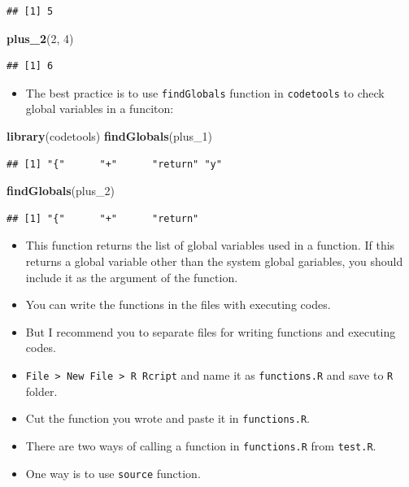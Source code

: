 \documentclass[]{book}
\newenvironment{Shaded}{\begin{snugshade}}{\end{snugshade}}
\newcommand{\KeywordTok}[1]{\textcolor[rgb]{0.13,0.29,0.53}{\textbf{#1}}}
\newcommand{\DecValTok}[1]{\textcolor[rgb]{0.00,0.00,0.81}{#1}}
\newcommand{\NormalTok}[1]{#1}
\providecommand{\tightlist}{%
  \setlength{\itemsep}{0pt}\setlength{\parskip}{0pt}}
\begin{document}
\begin{verbatim}
## [1] 5
\end{verbatim}

\begin{Shaded}
\begin{Highlighting}[]
\KeywordTok{plus_2}\NormalTok{(}\DecValTok{2}\NormalTok{, }\DecValTok{4}\NormalTok{)}
\end{Highlighting}
\end{Shaded}

\begin{verbatim}
## [1] 6
\end{verbatim}

\begin{itemize}
\tightlist
\item
  The best practice is to use \texttt{findGlobals} function in
  \texttt{codetools} to check global variables in a funciton:
\end{itemize}

\begin{Shaded}
\begin{Highlighting}[]
\KeywordTok{library}\NormalTok{(codetools)}
\KeywordTok{findGlobals}\NormalTok{(plus_}\DecValTok{1}\NormalTok{)}
\end{Highlighting}
\end{Shaded}

\begin{verbatim}
## [1] "{"      "+"      "return" "y"
\end{verbatim}

\begin{Shaded}
\begin{Highlighting}[]
\KeywordTok{findGlobals}\NormalTok{(plus_}\DecValTok{2}\NormalTok{)}
\end{Highlighting}
\end{Shaded}

\begin{verbatim}
## [1] "{"      "+"      "return"
\end{verbatim}

\begin{itemize}
\item
  This function returns the list of global variables used in a function.
  If this returns a global variable other than the system global
  gariables, you should include it as the argument of the function.
\item
  You can write the functions in the files with executing codes.
\item
  But I recommend you to separate files for writing functions and
  executing codes.
\item
  \texttt{File\ \textgreater{}\ New\ File\ \textgreater{}\ R\ Rcript}
  and name it as \texttt{functions.R} and save to \texttt{R} folder.
\item
  Cut the function you wrote and paste it in \texttt{functions.R}.
\item
  There are two ways of calling a function in \texttt{functions.R} from
  \texttt{test.R}.
\item
  One way is to use \texttt{source} function.
\end{itemize}
\end{document}
